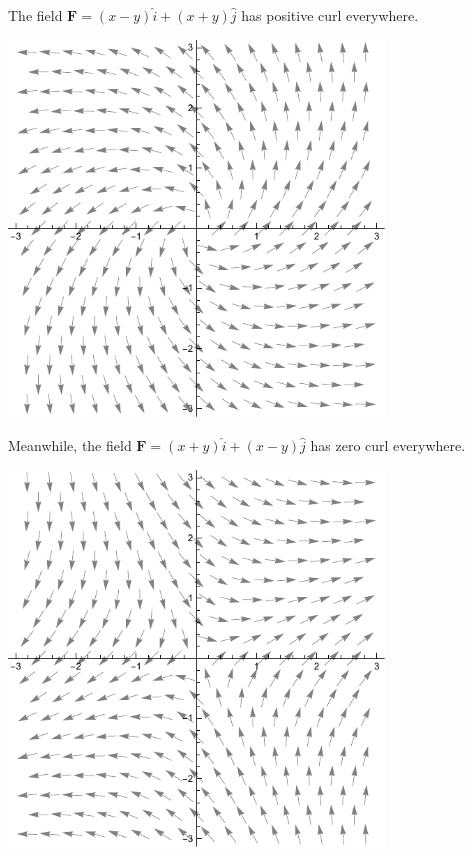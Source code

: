 \documentclass[10pt]{mypackage}
\begin{document}
\begin{example}
  The field $\mathbf{F} = \left(x-y\right)\widehat{i} + \left(x+y\right)\widehat{j}$ has positive curl everywhere.
  \begin{center}
    \includegraphics[width=10cm]{images/curl1a.pdf}
  \end{center}
  Meanwhile, the field $\mathbf{F} = \left(x+y\right)\widehat{i} + \left(x-y\right)\widehat{j}$ has zero curl everywhere.
  \begin{center}
    \includegraphics[width=10cm]{images/curl1b.pdf}
  \end{center}
\end{example}
\end{document}

